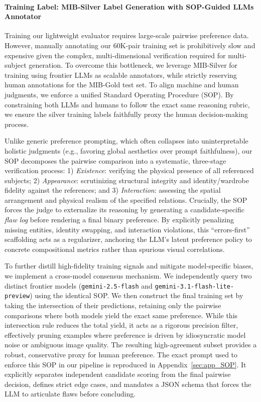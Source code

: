 \documentclass{article}
\begin{document}
\paragraph{Training Label: MIB-Silver Label Generation with SOP-Guided LLMs Annotator}
\label{sec:method_sop_alignment}

Training our lightweight evaluator requires large-scale pairwise preference data. However, manually annotating our 60K-pair training set is prohibitively slow and expensive given the complex, multi-dimensional verification required for multi-subject generation. To overcome this bottleneck, we leverage MIB-Silver for training using frontier LLMs as scalable annotators, while strictly reserving human annotations for the MIB-Gold test set. To align machine and human judgments, we enforce a unified Standard Operating Procedure (SOP). By constraining both LLMs and humans to follow the exact same reasoning rubric, we ensure the silver training labels faithfully proxy the human decision-making process.

Unlike generic preference prompting, which often collapses into uninterpretable holistic judgments (e.g., favoring global aesthetics over prompt faithfulness), our SOP decomposes the pairwise comparison into a systematic, three-stage verification process: 1) \emph{Existence}: verifying the physical presence of all referenced subjects; 2) \emph{Appearance}: scrutinizing structural integrity and identity/wardrobe fidelity against the references; and 3) \emph{Interaction}: assessing the spatial arrangement and physical realism of the specified relations. Crucially, the SOP forces the judge to externalize its reasoning by generating a candidate-specific \emph{flaw log} before rendering a final binary preference. By explicitly penalizing missing entities, identity swapping, and interaction violations, this ``errors-first'' scaffolding acts as a regularizer, anchoring the LLM's latent preference policy to concrete compositional metrics rather than spurious visual correlations.

To further distill high-fidelity training signals and mitigate model-specific biases, we implement a cross-model consensus mechanism. We independently query two distinct frontier models (\texttt{gemini-2.5-flash} and \texttt{gemini-3.1-flash-lite-preview}) using the identical SOP. We then construct the final training set by taking the intersection of their predictions, retaining only the pairwise comparisons where both models yield the exact same preference. While this intersection rule reduces the total yield, it acts as a rigorous precision filter, effectively pruning examples where preference is driven by idiosyncratic model noise or ambiguous image quality. The resulting high-agreement subset provides a robust, conservative proxy for human preference. The exact prompt used to enforce this SOP in our pipeline is reproduced in Appendix~\ref{sec:app_SOP}. It explicitly separates independent candidate scoring from the final pairwise decision, defines strict edge cases, and mandates a JSON schema that forces the LLM to articulate flaws before concluding.
\end{document}
